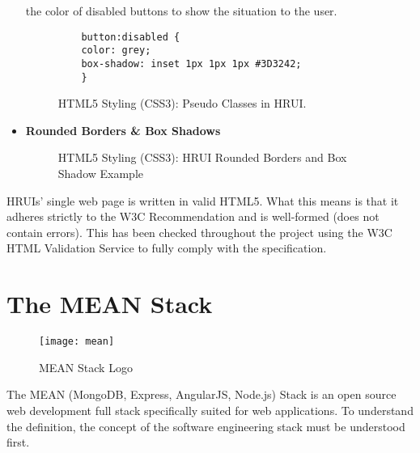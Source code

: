 \begin{itemize}
  the color of disabled buttons to show the situation to the user.
  \begin{figure}[h]
    \centering
    \begin{verbatim}
    button:disabled {
    color: grey;
    box-shadow: inset 1px 1px 1px #3D3242;
    }
    \end{verbatim}
    \caption{HTML5 Styling (CSS3): Pseudo Classes in HRUI.}
  \end{figure}
  \item \textbf{Rounded Borders \& Box Shadows}
  \begin{figure}[H]
    \begin{center}
    \end{center}
    \caption{HTML5 Styling (CSS3): HRUI Rounded Borders and Box Shadow Example}
  \end{figure}
\end{itemize}

HRUIs' single web page is written in valid HTML5. What this means is that it adheres strictly to the W3C Recommendation and
is well-formed (does not contain errors). This has been checked throughout the project using the W3C HTML Validation Service
\cite{w3cvalidation} to fully comply with the specification.
\section{The MEAN Stack} \label{TheMEANStack}
\begin{figure}[H]
    \begin{center}
      \texttt{[image: mean]}
    \end{center}
    \caption{MEAN Stack Logo}
  \end{figure}
The MEAN (MongoDB, Express, AngularJS, Node.js) Stack is an open source web development full stack specifically suited for
web applications. To understand the definition, the concept of the software engineering stack must be understood first.\\

